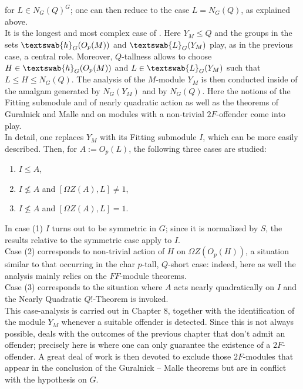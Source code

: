 \documentclass{amsart}
\numberwithin{equation}{section}
\theoremstyle{definition}
\theoremstyle{subresult}
\theoremstyle{caseresult}
\newcommand{\cL}{\textswab{L}}
\newcommand{\<}{\langle}
\renewcommand{\>}{\rangle}
\newcommand{\h}{\textswab{h}}
\begin{document}
\begin{enumerate}
\begin{enumerate}[label=(Asym: \alph*), itemindent=0.5cm]
\begin{center}
					\end{center}
					for $L \in N_G(Q)^G$; one can then reduce to the case $L=N_G(Q)$, as explained above.\\
                    It is the longest and most complex case of \cite{Meier-Stell-Stroth:2012}. Here $Y_M \le Q$ and the groups in the sets $\h_G(O_p(M))$ and $\cL_G(Y_M)$ play, as in the previous case, a central role. Moreover, $Q$-tallness allows to choose $H \in \h_G(O_p(M))$ and $L \in \cL_G(Y_M)$  such that $L \le H \le N_G(Q)$. The analysis of the $M$-module $Y_M$ is then conducted inside of the amalgam generated by $N_G(Y_M)$ and by $N_G(Q)$. Here the notions of the Fitting submodule and of nearly quadratic action as well as the theorems of Guralnick and Malle \cite{Guralnick-Malle:2002} and \cite{Guralnick-Malle:2004} on modules with a non-trivial $2F$-offender come into play.\\
		In detail, one replaces $Y_M$ with its Fitting submodule $I$, which can be more easily described. Then, for $A := O_p(L)$, the following three cases are studied:
		\begin{enumerate}[(1)]
			\item $I \le A$,
			\item $I \not \le A$ and $[\Omega Z(A),L] \ne 1$,
			\item $I \not \le A$ and $[\Omega Z(A),L] = 1$.
		\end{enumerate} 
		In case (1) $I$ turns out to be symmetric in $G$; since it is normalized by $S$, the results relative to the symmetric case apply to $I$.\\
		Case (2) corresponds to non-trivial action of $H$ on $\Omega Z(O_p(H))$, a situation similar to that occurring in the char $p$-tall, $Q$-short case: indeed, here as well the analysis mainly relies on the $FF$-module theorems.\\
		Case (3) corresponds to the situation where $A$ acts nearly quadratically on $I$ and the Nearly Quadratic $Q!$-Theorem \cite[Theorem D.11]{Meier-Stell-Stroth:2012} is invoked.\\
		This case-analysis is carried out in Chapter 8, together with the identification of the module $Y_M$ whenever a suitable offender is detected. Since this is not always possible, \cite[Chapter 9]{Meier-Stell-Stroth:2012} deals with the outcomes of the previous chapter that don't admit an offender; precisely here is where one can only guarantee the existence of a $2F$-offender. A great deal of work is then devoted to exclude those $2F$-modules that appear in the conclusion of the Guralnick -- Malle theorems but are in conflict with the hypothesis on $G$.
			\end{enumerate}
\end{enumerate}
\end{document}
